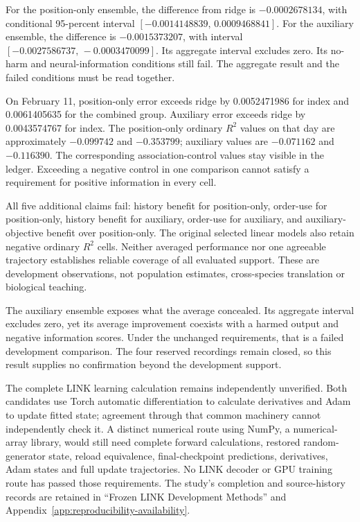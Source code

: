 For the position-only ensemble, the difference from ridge is
$-0.0002678134$, with conditional 95-percent interval
$[-0.0014148839,\,0.0009468841]$. For the auxiliary ensemble, the difference is
$-0.0015373207$, with interval $[-0.0027586737,\,-0.0003470099]$. Its aggregate
interval excludes zero. Its no-harm and neural-information conditions still
fail. The aggregate result and the failed conditions must be read together.

On February 11, position-only error exceeds ridge by 0.0052471986 for index and
0.0061405635 for the combined group. Auxiliary error exceeds ridge by
0.0043574767 for index. The position-only ordinary $R^2$ values on that day
are approximately $-0.099742$ and $-0.353799$; auxiliary values are
$-0.071162$ and $-0.116390$. The corresponding association-control values
stay visible in the ledger. Exceeding a negative control in one comparison
cannot satisfy a requirement for positive information in every cell.

All five additional claims fail: history benefit for position-only, order-use
for position-only, history benefit for auxiliary, order-use for auxiliary,
and auxiliary-objective benefit over position-only. The original selected
linear models also retain negative ordinary $R^2$ cells. Neither averaged
performance nor one agreeable trajectory establishes reliable coverage of all
evaluated support. These are development observations, not population estimates,
cross-species translation or biological teaching.

The auxiliary ensemble exposes what the average concealed. Its aggregate interval excludes zero, yet its average improvement coexists with a harmed output and negative information scores. Under the unchanged requirements, that is a failed development comparison. The four reserved recordings remain closed, so this result supplies no confirmation beyond the development support.

The complete LINK learning calculation remains independently unverified. Both candidates use Torch automatic differentiation to calculate derivatives and Adam to update fitted state; agreement through that common machinery cannot independently check it. A distinct numerical route using NumPy, a numerical-array library, would still need complete forward calculations, restored random-generator state, reload equivalence, final-checkpoint predictions, derivatives, Adam states and full update trajectories. No LINK decoder or GPU training route has passed those requirements. The study's completion and source-history records are retained in ``Frozen LINK Development Methods'' and Appendix~\ref{app:reproducibility-availability}.

